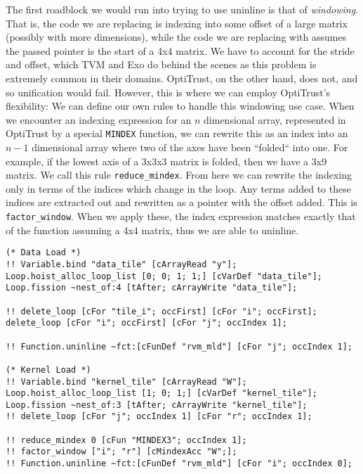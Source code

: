 \documentclass[acmsmall, nonacm=true]{acmart}
\begin{document}
The first roadblock we would run into trying to use uninline is that of \textit{windowing}. That is, the code we are replacing is indexing into some offset of a large matrix (possibly with more dimensions), while the code we are replacing with assumes the passed pointer is the start of a 4x4 matrix. We have to account for the stride and offset, which TVM and Exo do behind the scenes as this problem is extremely common in their domains. OptiTrust, on the other hand, does not, and so unification would fail. However, this is where we can employ OptiTrust's flexibility: We can define our own rules to handle this windowing use case. When we encounter an indexing expression for an $n$ dimensional array, represented in OptiTrust by a special \verb|MINDEX| function, we can rewrite this as an index into an $n-1$ dimensional array where two of the axes have been ``folded`` into one. For example, if the lowest axis of a 3x3x3 matrix is folded, then we have a 3x9 matrix. We call this rule \verb|reduce_mindex|. From here we can rewrite the indexing only in terms of the indices which change in the loop. Any terms added to these indices are extracted out and rewritten as a pointer with the offset added. This is \verb|factor_window|. When we apply these, the index expression matches exactly that of the function assuming a 4x4 matrix, thus we are able to uninline.
\begin{listing}
    \begin{verbatim}
(* Data Load *)
!! Variable.bind "data_tile" [cArrayRead "y"];
Loop.hoist_alloc_loop_list [0; 0; 1; 1;] [cVarDef "data_tile"];
Loop.fission ~nest_of:4 [tAfter; cArrayWrite "data_tile"];

!! delete_loop [cFor "tile_i"; occFirst] [cFor "i"; occFirst];
delete_loop [cFor "i"; occFirst] [cFor "j"; occIndex 1];

!! Function.uninline ~fct:[cFunDef "rvm_mld"] [cFor "j"; occIndex 1];

(* Kernel Load *)
!! Variable.bind "kernel_tile" [cArrayRead "W"];
Loop.hoist_alloc_loop_list [1; 0; 1;] [cVarDef "kernel_tile"];
Loop.fission ~nest_of:3 [tAfter; cArrayWrite "kernel_tile"];
!! delete_loop [cFor "j"; occIndex 1] [cFor "r"; occIndex 1];

!! reduce_mindex 0 [cFun "MINDEX3"; occIndex 1];
!! factor_window ["i"; "r"] [cMindexAcc "W";];
!! Function.uninline ~fct:[cFunDef "rvm_mld"] [cFor "i"; occIndex 0];
    \end{verbatim}
    \caption{Staging and offloading of data and kernel loads.}
    \label{lst:conv1d_optitrust_data_kernel}
    \end{listing}
\end{document}
